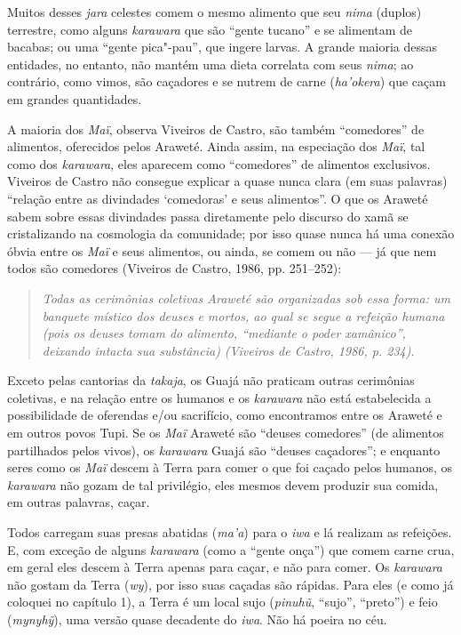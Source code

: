 Muitos desses \emph{jara} celestes comem o mesmo alimento que seu
\emph{nima} (duplos) terrestre, como alguns \emph{karawara} que são
``gente tucano'' e se alimentam de bacabas; ou uma ``gente pica"-pau'',
que ingere larvas. A grande maioria dessas entidades, no entanto, não
mantém uma dieta correlata com seus \emph{nima}; ao contrário, como
vimos, são caçadores e se nutrem de carne (\emph{ha'okera}) que caçam em
grandes quantidades.

A maioria dos \emph{Maï}, observa Viveiros de Castro, são também
``comedores'' de alimentos, oferecidos pelos Araweté. Ainda assim, na
especiação dos \emph{Maï}, tal como dos \emph{karawara}, eles aparecem
como ``comedores'' de alimentos exclusivos. Viveiros de Castro não
consegue explicar a quase nunca clara (em suas palavras) ``relação entre
as divindades `comedoras' e seus alimentos''. O que os Araweté sabem
sobre essas divindades passa diretamente pelo discurso do xamã se
cristalizando na cosmologia da comunidade; por isso quase nunca há uma
conexão óbvia entre os \emph{Maï} e seus alimentos, ou ainda, se comem
ou não --- já que nem todos são comedores (Viveiros de Castro, 1986, pp.
251--252):

\begin{quote}
\emph{Todas as cerimônias coletivas Araweté são organizadas sob essa forma: um
banquete místico dos deuses e mortos, ao qual se segue a refeição humana
(pois os deuses tomam do alimento, ``mediante o poder xamânico'', deixando
intacta sua substância) (Viveiros de Castro, 1986, p. 234)}.
\end{quote}

Exceto pelas cantorias da \emph{takaja}, os Guajá não praticam outras
cerimônias coletivas, e na relação entre os humanos e os \emph{karawara}
não está estabelecida a possibilidade de oferendas e/ou sacrifício, como
encontramos entre os Araweté e em outros povos Tupi. Se os \emph{Maï}
Araweté são ``deuses comedores'' (de alimentos partilhados pelos vivos),
os \emph{karawara} Guajá são ``deuses caçadores''; e enquanto seres como
os \emph{Maï} descem à Terra para comer o que foi caçado pelos humanos,
os \emph{karawara} não gozam de tal privilégio, eles mesmos devem
produzir sua comida, em outras palavras, caçar.

Todos carregam suas presas abatidas (\emph{ma'a}) para o \emph{iwa} e lá
realizam as refeições. E, com exceção de alguns \emph{karawara} (como a
``gente onça'') que comem carne crua, em geral eles descem à Terra
apenas para caçar, e não para comer. Os \emph{karawara} não gostam da
Terra (\emph{wy}), por isso suas caçadas são rápidas. Para eles (e como
já coloquei no capítulo 1), a Terra é um local sujo (\emph{pinuhũ},
``sujo'', ``preto'') e feio (\emph{mynyhỹ}), uma versão quase decadente do
\emph{iwa}. Não há poeira no céu.

